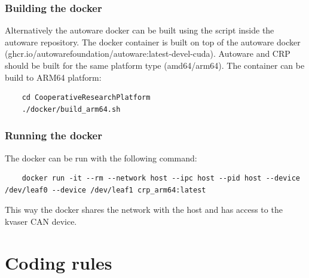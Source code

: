 \documentclass[sn-mathphys-num]{sn-jnl}%
\begin{document}
\subsubsection{Building the docker}
Alternatively the autoware docker can be built using the script inside the autoware repository. The docker container is built on top of the autoware docker (ghcr.io/autowarefoundation/autoware:latest-devel-cuda). Autoware and CRP should be built for the same platform type (amd64/arm64).
\newline
The container can be build to ARM64 platform:
\begin{lstlisting}
    cd CooperativeResearchPlatform
    ./docker/build_arm64.sh
\end{lstlisting}
\subsubsection{Running the docker}
The docker can be run with the following command:
\begin{lstlisting}
    docker run -it --rm --network host --ipc host --pid host --device /dev/leaf0 --device /dev/leaf1 crp_arm64:latest
\end{lstlisting}
This way the docker shares the network with the host and has access to the kvaser CAN device.

\section{Coding rules} \label{sec:coding_rules}
\end{document}
